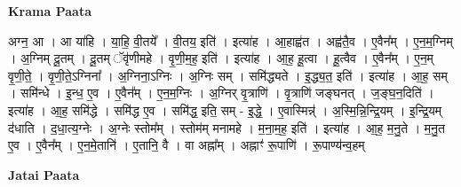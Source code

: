 \documentclass[17pt]{extarticle}
\begin{document}
\textbf{Krama Paata} \newline

अग्न॒ आ । आ या॑हि । या॒हि॒ वी॒तये᳚ । वी॒तय॒ इति॑ । इत्या॑ह । आ॒हाह्व॑त । अह्व॑तै॒व । ए॒वैन᳚म् । ए॒न॒म॒ग्निम् । अ॒ग्निम् दू॒तम् । दू॒तम् ॅवृ॑णीमहे । वृ॒णी॒म॒ह॒ इति॑ । इत्या॑ह । आ॒ह॒ हू॒त्वा । हू॒त्वैव । ए॒वैन᳚म् । ए॒न॒म् वृ॒णी॒ते॒ । वृ॒णी॒ते॒ऽग्निना᳚ । अ॒ग्निना॒ऽग्निः । अ॒ग्निः सम् । समि॑द्ध्यते । इ॒द्ध्य॒त॒ इति॑ । इत्या॑ह । आ॒ह॒ सम् । समि॑न्धे । इ॒न्ध॒ ए॒व । ए॒वैन᳚म् । ए॒न॒म॒ग्निः । अ॒ग्निर् वृ॒त्राणि॑ । वृ॒त्राणि॑ जङ्घनत् । ज॒ङ्घ॒न॒दिति॑ । इत्या॑ह । आ॒ह॒ समि॑द्धे । समि॑द्ध ए॒व । समि॑द्ध॒ इति॒ सम् - इ॒द्धे॒ । ए॒वास्मिन्न्॑ । अ॒स्मि॒न्नि॒न्द्रि॒यम् । इ॒न्द्रि॒यम् द॑धाति । द॒धा॒त्य॒ग्नेः । अ॒ग्नेः स्तोम᳚म् । स्तोम॑म् मनामहे । म॒ना॒म॒ह॒ इति॑ । इत्या॑ह । आ॒ह॒ म॒नु॒ते । म॒नु॒त ए॒व । ए॒वैन᳚म् । ए॒न॒मे॒तानि॑ । ए॒तानि॒ वै । वा अह्ना᳚म् । अह्नाꣳ॑ रू॒पाणि॑ । रू॒पाण्य॑न्व॒हम् \newline

\textbf{Jatai Paata} \newline
\end{document}
